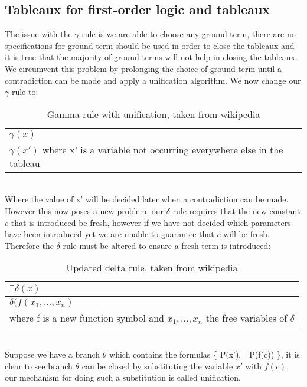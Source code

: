 \documentclass{article}%
\begin{document}
\subsection{Tableaux for first-order logic and tableaux}
The issue with the $\gamma$ rule is we are able to choose any ground term, there are no specifications for ground term should be used in order to close the tableaux and it is true that the majority of ground terms will not help in closing the tableaux. We circumvent this problem by prolonging the choice of ground term until a contradiction can be made and apply a unification algorithm. \cite{fitting_2013} We now change our $\gamma$ rule to:
\begin{table}[h]
\centering
\begin{tabular}{l}
$\gamma(x)$                                                                      \\
$\gamma(x')$ where x' is a variable not occurring everywhere else in the tableau
\end{tabular}
\caption{Gamma rule with unification, taken from wikipedia \cite{wikipediatableau}}
\label{tab:gammawithunification}
\end{table}\\
Where the value of x' will be decided later when a contradiction can be made. 
However this now poses a new problem, our $\delta$ rule requires that the new constant $c$ that is introduced be fresh, however if we have not decided which parameters have been introduced yet we are unable to guarantee that $c$ will be fresh. Therefore the  
$\delta$ rule must be altered to ensure a fresh term is introduced:  
\begin{table}[h]
\centering
\begin{tabular}{|l|}
\hline
$\exists\delta(x)$                                                                                        \\ \hline
$\delta(f(x_1,...,x_n)$ \\ where f is a new function symbol and $x_1,...,x_n$ the free variables of $\delta$ \\ \hline
\end{tabular}
\caption{Updated delta rule, taken from wikipedia \cite{wikipediatableau}}
\label{tab:deltarule}
\end{table}\\

Suppose we have a branch $\theta$ which contains the formulas \{ P(x'), $\neg$P(f(c)) \}, it is clear to see branch $\theta$  can be closed by substituting the variable $x'$ with $f(c)$, our mechanism for doing such a substitution is called unification. 
\end{document}
